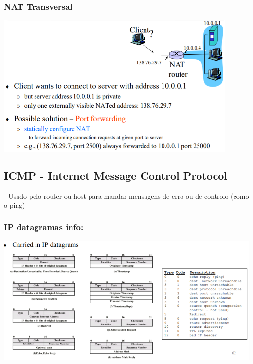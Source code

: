 \documentclass[../resumosRCOM.tex]{subfiles}
\begin{document}
\subsubsection{NAT Transversal}
\begin{center}
    \includegraphics[width=12cm]{images/RCOM29.png}
\end{center}
    
\subsection{ICMP - Internet Message Control Protocol}

- Usado pelo router ou host para mandar mensagens de erro ou de controlo (como o ping)

\subsubsection{IP datagramas info:}
\begin{center}
    \includegraphics[width=15cm]{images/RCOM30.png}
\end{center}
\end{document}
